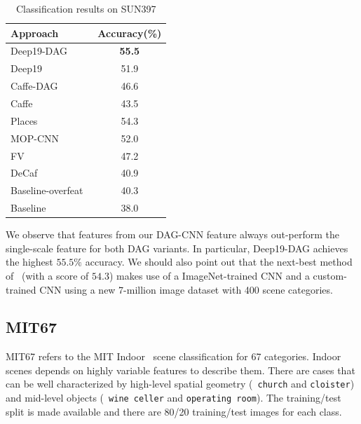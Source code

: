 \documentclass[10pt,twocolumn,letterpaper]{article}
\begin{document}
\begin{table}[htbp]
\begin{center}
\begin{tabular}{|l|c|}
\hline
Approach & Accuracy(\%) \\
\hline
Deep19-DAG & \textbf{55.5} \\
Deep19~\cite{veryDeep} & 51.9 \\
Caffe-DAG & 46.6	\\
Caffe~\cite{Caffe} & 43.5 \\ \hline
Places~\cite{zhoulearning}	& 54.3	\\
MOP-CNN~\cite{Gong14} & 52.0 \\
FV~\cite{FV} & 47.2 \\
DeCaf~\cite{DeCaf} & 40.9	\\
Baseline-overfeat~\cite{SUN_ijcv}	&40.3 \\
Baseline~\cite{SUN397} & 38.0 \\
\hline
\end{tabular}
\end{center}
\caption{Classification results on SUN397}
\label{table:SUN397}
\end{table}

We observe that features from our DAG-CNN feature always out-perform the single-scale feature for both DAG variants. In particular, Deep19-DAG achieves the highest $55.5\%$ accuracy. We should also point out that the next-best method of~\cite{zhoulearning} (with a score of $54.3$) makes use of a ImageNet-trained CNN and a custom-trained CNN using a new 7-million image dataset with 400 scene categories.


\subsection{MIT67}

MIT67 refers to the MIT Indoor~\cite{MIT67} scene classification for 67 categories. Indoor scenes depends on highly variable features to describe them. There are cases that can be well characterized by high-level spatial geometry (\eg~{\tt church} and {\tt cloister}) and mid-level objects (\eg~{\tt wine celler} and {\tt operating room}). The training/test split is made available and there are 80/20 training/test images for each class.
\end{document}
